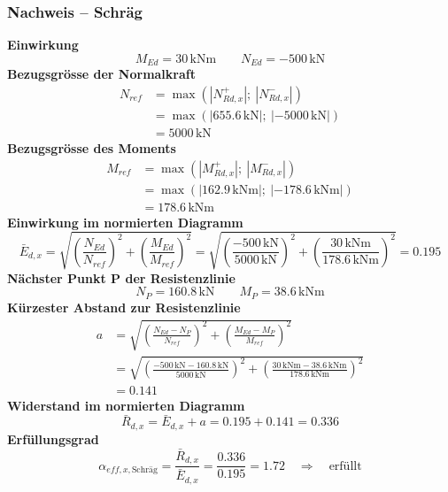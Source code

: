 \documentclass[11pt,a4paper]{article}
\begin{document}
\subsubsection{Nachweis – Schräg}
\noindent\textbf{Einwirkung}
\begin{equation*}
M_{Ed} = 30\,\mathrm{kNm} \qquad N_{Ed} = -500\,\mathrm{kN}
\end{equation*}
\noindent\textbf{Bezugsgrösse der Normalkraft}
\begin{equation*}
\begin{aligned}
  N_{ref} &= \max\left(\left|N_{Rd,x}^{+}\right|;\ \left|N_{Rd,x}^{-}\right|\right) \\
  &= \max\left(\left|655.6\,\mathrm{kN}\right|;\ \left|-5000\,\mathrm{kN}\right|\right) \\
  &= 5000\,\mathrm{kN}
\end{aligned}
\end{equation*}
\noindent\textbf{Bezugsgrösse des Moments}
\begin{equation*}
\begin{aligned}
  M_{ref} &= \max\left(\left|M_{Rd,x}^{+}\right|;\ \left|M_{Rd,x}^{-}\right|\right) \\
  &= \max\left(\left|162.9\,\mathrm{kNm}\right|;\ \left|-178.6\,\mathrm{kNm}\right|\right) \\
  &= 178.6\,\mathrm{kNm}
\end{aligned}
\end{equation*}
\noindent\textbf{Einwirkung im normierten Diagramm}
\begin{equation*}
\bar{E}_{d,x} = \sqrt{\left(\frac{N_{Ed}}{N_{ref}}\right)^{2} + \left(\frac{M_{Ed}}{M_{ref}}\right)^{2}} = \sqrt{\left(\frac{-500\,\mathrm{kN}}{5000\,\mathrm{kN}}\right)^{2} + \left(\frac{30\,\mathrm{kNm}}{178.6\,\mathrm{kNm}}\right)^{2}} = 0.195
\end{equation*}
\noindent\textbf{Nächster Punkt P der Resistenzlinie}
\begin{equation*}
N_P = 160.8\,\mathrm{kN} \qquad M_P = 38.6\,\mathrm{kNm}
\end{equation*}
\noindent\textbf{Kürzester Abstand zur Resistenzlinie}
\begin{equation*}
\begin{aligned}
  a &= \sqrt{\left(\frac{N_{Ed} - N_P}{N_{ref}}\right)^{2} + \left(\frac{M_{Ed} - M_P}{M_{ref}}\right)^{2}} \\
  &= \sqrt{\left(\frac{-500\,\mathrm{kN} - 160.8\,\mathrm{kN}}{5000\,\mathrm{kN}}\right)^{2} + \left(\frac{30\,\mathrm{kNm} - 38.6\,\mathrm{kNm}}{178.6\,\mathrm{kNm}}\right)^{2}} \\
  &= 0.141
\end{aligned}
\end{equation*}
\noindent\textbf{Widerstand im normierten Diagramm}
\begin{equation*}
\bar{R}_{d,x} = \bar{E}_{d,x} + a = 0.195 + 0.141 = 0.336
\end{equation*}
\noindent\textbf{Erfüllungsgrad}
\begin{equation*}
\alpha_{eff,x,\text{Schräg}} = \frac{\bar{R}_{d,x}}{\bar{E}_{d,x}} = \frac{0.336}{0.195} = 1.72 \quad \Rightarrow \quad \text{erfüllt}
\end{equation*}
\end{document}
